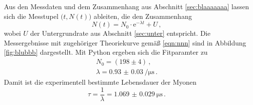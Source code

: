 Aus den Messdaten und dem Zusammenhang aus Abschnitt \ref{sec:blaaaaaaa} lassen sich die 
Messtupel $\big(t, N(t)\big)$ ableiten, die den Zusammenhang 
\begin{equation}
	\label{eqn:nnn}
	N(t) = N_0 \cdot \mathrm{e}^{-\lambda t} + U \, \mathrm{,}
\end{equation}
wobei $U$ der Untergrundrate aus Abschnitt \ref{sec:unter} entspricht. 
Die Messergebnisse mit zugehöriger Theoriekurve gemäß \eqref{eqn:nnn} sind in Abbildung 
\ref{fig:blubbb} dargestellt.
Mit Python \cite{numpy} ergeben sich die Fitparamter zu
\begin{align*}
	N_0 = (198 \pm 4 ) \, \mathrm{,} \\
	\lambda = \SI{0.93(3)}{\per\micro\second} \, \mathrm{.}
\end{align*}
Damit ist die experimentell bestimmte Lebensdauer der Myonen
\begin{equation*}
	\tau = \frac{1}{\lambda} = \SI{1.069(29)}{\micro\second} \, \mathrm{.}
\end{equation*}
